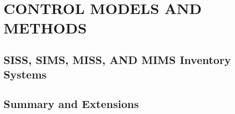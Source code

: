 \chapter{CONTROL MODELS AND METHODS}\label{chap:15}

\section{SISS, SIMS, MISS, AND MIMS Inventory Systems}


\section{Summary and Extensions}

